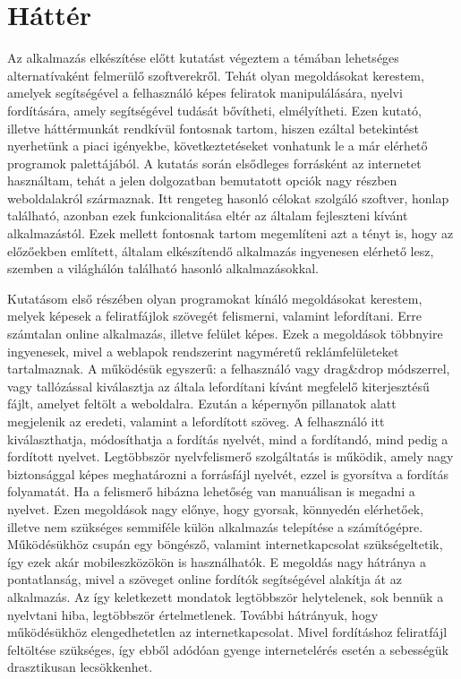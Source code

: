 \chapter{Háttér}
Az alkalmazás elkészítése előtt kutatást végeztem a témában lehetséges alternatívaként felmerülő szoftverekről. Tehát olyan megoldásokat kerestem, amelyek segítségével a felhasználó képes feliratok manipulálására, nyelvi fordítására, amely segítségével tudását bővítheti, elmélyítheti. Ezen kutató, illetve háttérmunkát rendkívül fontosnak tartom, hiszen ezáltal betekintést nyerhetünk a piaci igényekbe, következtetéseket vonhatunk le a már elérhető programok palettájából. A kutatás során elsődleges forrásként az internetet használtam, tehát a jelen dolgozatban bemutatott opciók nagy részben weboldalakról származnak. Itt rengeteg hasonló célokat szolgáló szoftver, honlap található, azonban ezek funkcionalitása eltér az általam fejleszteni kívánt alkalmazástól. Ezek mellett fontosnak tartom megemlíteni azt a tényt is, hogy az előzőekben említett, általam elkészítendő alkalmazás ingyenesen elérhető lesz, szemben a világhálón található hasonló alkalmazásokkal.

Kutatásom első részében olyan programokat kínáló megoldásokat kerestem, melyek képesek a feliratfájlok szövegét felismerni, valamint lefordítani. Erre számtalan online alkalmazás, illetve felület képes. Ezek a megoldások többnyire ingyenesek, mivel a weblapok rendszerint nagyméretű reklámfelületeket tartalmaznak. A működésük egyszerű: a felhasználó vagy drag\&drop módszerrel, vagy tallózással kiválasztja az általa lefordítani kívánt megfelelő kiterjesztésű fájlt, amelyet feltölt a weboldalra. Ezután a képernyőn pillanatok alatt megjelenik az eredeti, valamint a lefordított szöveg. A felhasználó itt kiválaszthatja, módosíthatja a fordítás nyelvét, mind a fordítandó, mind pedig a fordított nyelvet. Legtöbbször nyelvfelismerő szolgáltatás is működik, amely nagy biztonsággal képes meghatározni a forrásfájl nyelvét, ezzel is gyorsítva a fordítás folyamatát. Ha a felismerő hibázna lehetőség van manuálisan is megadni a nyelvet. Ezen megoldások nagy előnye, hogy gyorsak, könnyedén elérhetőek, illetve nem szükséges semmiféle külön alkalmazás telepítése a számítógépre. Működésükhöz csupán egy böngésző, valamint internetkapcsolat szükségeltetik, így ezek akár mobileszközökön is használhatók. E megoldás nagy hátránya a pontatlanság, mivel a szöveget online fordítók segítségével alakítja át az alkalmazás. Az így keletkezett mondatok legtöbbször helytelenek, sok bennük a nyelvtani hiba, legtöbbször értelmetlenek. További hátrányuk, hogy működésükhöz elengedhetetlen az internetkapcsolat. Mivel fordításhoz feliratfájl feltöltése szükséges, így ebből adódóan gyenge internetelérés esetén a sebességük drasztikusan lecsökkenhet.

